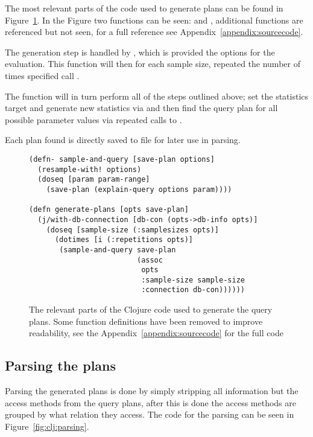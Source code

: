 The most relevant parts of the code used to generate plans can be found in
Figure~\ref{fig:clj:generating}. In the Figure two functions can be seen:
 and , additional functions are
referenced but not seen, for a full reference see Appendix~\ref{appendix:sourcecode}.

The generation step is handled by , which is provided the
options for the evaluation. This function will then for each sample size,
repeated the number of times specified call .

The  function will in turn perform all of the steps
outlined above; set the statistics target and generate new statistics via
 and then find the query plan for all possible parameter
values via repeated calls to .

Each plan found is directly saved to file for later use in parsing.

\begin{figure}[ht]
  \begin{verbatim}
(defn- sample-and-query [save-plan options]
  (resample-with! options)
  (doseq [param param-range]
    (save-plan (explain-query options param))))

(defn generate-plans [opts save-plan]
  (j/with-db-connection [db-con (opts->db-info opts)]
    (doseq [sample-size (:samplesizes opts)]
      (dotimes [i (:repetitions opts)]
       (sample-and-query save-plan
                         (assoc
                          opts
                          :sample-size sample-size
                          :connection db-con))))))
   \end{verbatim}
   \caption[The clojure code to generate a query]{The relevant parts of the
     Clojure code used to generate the query plans. Some function definitions
     have been removed to improve readability, see the
     Appendix~\ref{appendix:sourcecode} for the full code}
\label{fig:clj:generating}
\end{figure}

\subsection{Parsing the plans}\label{sec:parsing}
Parsing the generated plans is done by simply stripping all information but the
access methods from the query plans, after this is done the access methods are
grouped by what relation they access. The code for the parsing can be seen in
Figure~\ref{fig:clj:parsing}.

